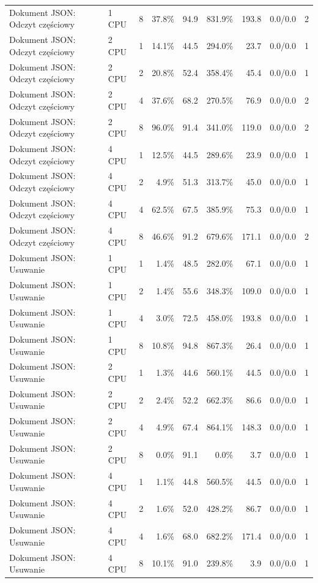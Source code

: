 \begin{table}[ht]
{\begin{tabular}{llcrrrrcc}
Dokument JSON: Odczyt częściowy & 1 CPU & 8 & 37.8\% & 94.9 & 831.9\% & 193.8 & 0.0/0.0 & 2 \\
Dokument JSON: Odczyt częściowy & 2 CPU & 1 & 14.1\% & 44.5 & 294.0\% & 23.7 & 0.0/0.0 & 1 \\
Dokument JSON: Odczyt częściowy & 2 CPU & 2 & 20.8\% & 52.4 & 358.4\% & 45.4 & 0.0/0.0 & 1 \\
Dokument JSON: Odczyt częściowy & 2 CPU & 4 & 37.6\% & 68.2 & 270.5\% & 76.9 & 0.0/0.0 & 2 \\
Dokument JSON: Odczyt częściowy & 2 CPU & 8 & 96.0\% & 91.4 & 341.0\% & 119.0 & 0.0/0.0 & 2 \\
Dokument JSON: Odczyt częściowy & 4 CPU & 1 & 12.5\% & 44.5 & 289.6\% & 23.9 & 0.0/0.0 & 1 \\
Dokument JSON: Odczyt częściowy & 4 CPU & 2 & 4.9\% & 51.3 & 313.7\% & 45.0 & 0.0/0.0 & 1 \\
Dokument JSON: Odczyt częściowy & 4 CPU & 4 & 62.5\% & 67.5 & 385.9\% & 75.3 & 0.0/0.0 & 1 \\
Dokument JSON: Odczyt częściowy & 4 CPU & 8 & 46.6\% & 91.2 & 679.6\% & 171.1 & 0.0/0.0 & 2 \\
Dokument JSON: Usuwanie & 1 CPU & 1 & 1.4\% & 48.5 & 282.0\% & 67.1 & 0.0/0.0 & 1 \\
Dokument JSON: Usuwanie & 1 CPU & 2 & 1.4\% & 55.6 & 348.3\% & 109.0 & 0.0/0.0 & 1 \\
Dokument JSON: Usuwanie & 1 CPU & 4 & 3.0\% & 72.5 & 458.0\% & 193.8 & 0.0/0.0 & 1 \\
Dokument JSON: Usuwanie & 1 CPU & 8 & 10.8\% & 94.8 & 867.3\% & 26.4 & 0.0/0.0 & 1 \\
Dokument JSON: Usuwanie & 2 CPU & 1 & 1.3\% & 44.6 & 560.1\% & 44.5 & 0.0/0.0 & 1 \\
Dokument JSON: Usuwanie & 2 CPU & 2 & 2.4\% & 52.2 & 662.3\% & 86.6 & 0.0/0.0 & 1 \\
Dokument JSON: Usuwanie & 2 CPU & 4 & 4.9\% & 67.4 & 864.1\% & 148.3 & 0.0/0.0 & 1 \\
Dokument JSON: Usuwanie & 2 CPU & 8 & 0.0\% & 91.1 & 0.0\% & 3.7 & 0.0/0.0 & 1 \\
Dokument JSON: Usuwanie & 4 CPU & 1 & 1.1\% & 44.8 & 560.5\% & 44.5 & 0.0/0.0 & 1 \\
Dokument JSON: Usuwanie & 4 CPU & 2 & 1.6\% & 52.0 & 428.2\% & 86.7 & 0.0/0.0 & 1 \\
Dokument JSON: Usuwanie & 4 CPU & 4 & 1.6\% & 68.0 & 682.2\% & 171.4 & 0.0/0.0 & 1 \\
Dokument JSON: Usuwanie & 4 CPU & 8 & 10.1\% & 91.0 & 239.8\% & 3.9 & 0.0/0.0 & 1 \\

\end{tabular}}
\end{table}
